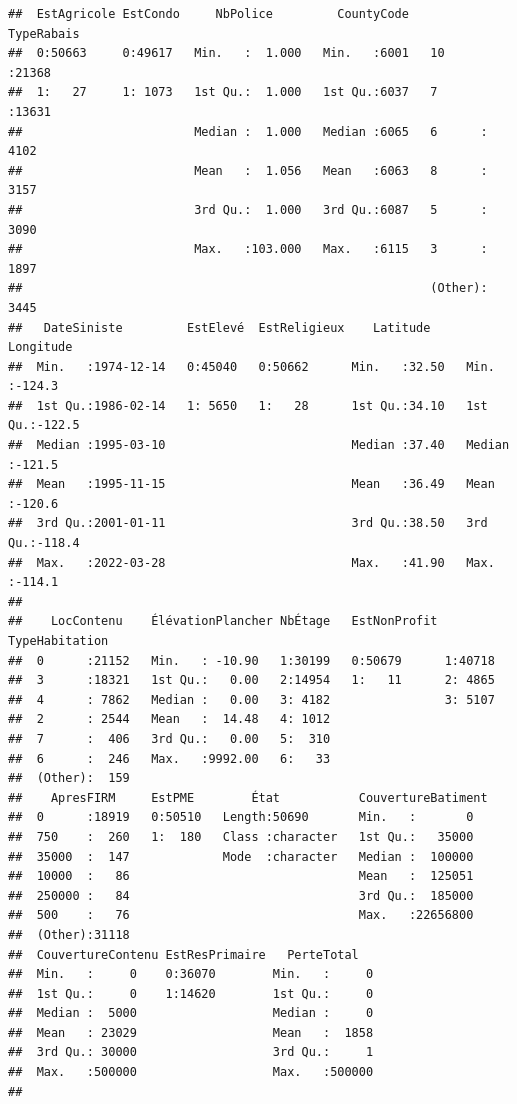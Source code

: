 \documentclass[
]{article}
\begin{document}
\begin{verbatim}
##  EstAgricole EstCondo     NbPolice         CountyCode     TypeRabais   
##  0:50663     0:49617   Min.   :  1.000   Min.   :6001   10     :21368  
##  1:   27     1: 1073   1st Qu.:  1.000   1st Qu.:6037   7      :13631  
##                        Median :  1.000   Median :6065   6      : 4102  
##                        Mean   :  1.056   Mean   :6063   8      : 3157  
##                        3rd Qu.:  1.000   3rd Qu.:6087   5      : 3090  
##                        Max.   :103.000   Max.   :6115   3      : 1897  
##                                                         (Other): 3445  
##   DateSiniste         EstElevé  EstReligieux    Latitude       Longitude     
##  Min.   :1974-12-14   0:45040   0:50662      Min.   :32.50   Min.   :-124.3  
##  1st Qu.:1986-02-14   1: 5650   1:   28      1st Qu.:34.10   1st Qu.:-122.5  
##  Median :1995-03-10                          Median :37.40   Median :-121.5  
##  Mean   :1995-11-15                          Mean   :36.49   Mean   :-120.6  
##  3rd Qu.:2001-01-11                          3rd Qu.:38.50   3rd Qu.:-118.4  
##  Max.   :2022-03-28                          Max.   :41.90   Max.   :-114.1  
##                                                                              
##    LocContenu    ÉlévationPlancher NbÉtage   EstNonProfit TypeHabitation
##  0      :21152   Min.   : -10.90   1:30199   0:50679      1:40718       
##  3      :18321   1st Qu.:   0.00   2:14954   1:   11      2: 4865       
##  4      : 7862   Median :   0.00   3: 4182                3: 5107       
##  2      : 2544   Mean   :  14.48   4: 1012                              
##  7      :  406   3rd Qu.:   0.00   5:  310                              
##  6      :  246   Max.   :9992.00   6:   33                              
##  (Other):  159                                                          
##    ApresFIRM     EstPME        État           CouvertureBatiment
##  0      :18919   0:50510   Length:50690       Min.   :       0  
##  750    :  260   1:  180   Class :character   1st Qu.:   35000  
##  35000  :  147             Mode  :character   Median :  100000  
##  10000  :   86                                Mean   :  125051  
##  250000 :   84                                3rd Qu.:  185000  
##  500    :   76                                Max.   :22656800  
##  (Other):31118                                                  
##  CouvertureContenu EstResPrimaire   PerteTotal    
##  Min.   :     0    0:36070        Min.   :     0  
##  1st Qu.:     0    1:14620        1st Qu.:     0  
##  Median :  5000                   Median :     0  
##  Mean   : 23029                   Mean   :  1858  
##  3rd Qu.: 30000                   3rd Qu.:     1  
##  Max.   :500000                   Max.   :500000  
## 
\end{verbatim}
\end{document}
